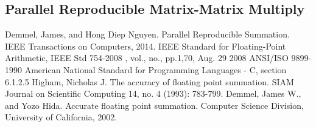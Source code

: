 \documentclass[12pt]{article}
\theoremstyle{definition}
\numberwithin{equation}{section}
\numberwithin{figure}{section}
\begin{document}
  \subsection{Parallel Reproducible Matrix-Matrix Multiply}
\begin{thebibliography}{9}
    Demmel, James, and Hong Diep Nguyen. Parallel Reproducible Summation. IEEE Transactions on Computers, 2014.
    IEEE Standard for Floating-Point Arithmetic, IEEE Std 754-2008 , vol., no., pp.1,70, Aug. 29 2008
    ANSI/ISO 9899-1990 American National Standard for Programming Languages - C, section 6.1.2.5
    Higham, Nicholas J. The accuracy of floating point summation. SIAM Journal on Scientific Computing 14, no. 4 (1993): 783-799.
    Demmel, James W., and Yozo Hida. Accurate floating point summation. Computer Science Division, University of California, 2002.
\end{thebibliography}
\end{document}
